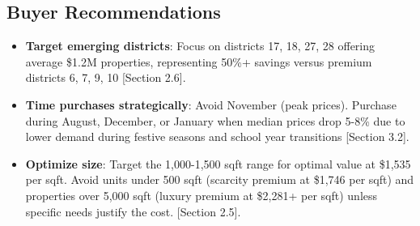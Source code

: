 \documentclass{article}
\begin{document}
\subsection{Buyer Recommendations}

\begin{itemize}
    \item \textbf{Target emerging districts}: Focus on districts 17, 18, 27, 28 offering average \$1.2M properties, representing 50\%+ savings versus premium districts 6, 7, 9, 10 [Section 2.6].
    
    \item \textbf{Time purchases strategically}: Avoid November (peak prices). Purchase during August, December, or January when median prices drop 5-8\% due to lower demand during festive seasons and school year transitions [Section 3.2].
    
    \item \textbf{Optimize size}: Target the 1,000-1,500 sqft range for optimal value at \$1,535 per sqft. Avoid units under 500 sqft (scarcity premium at \$1,746 per sqft) and properties over 5,000 sqft (luxury premium at \$2,281+ per sqft) unless specific needs justify the cost. [Section 2.5].

\end{itemize}
\end{document}
